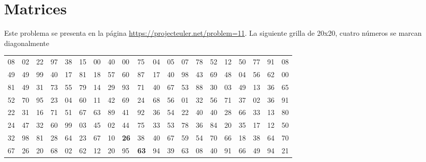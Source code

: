 \section{Matrices}

Este problema se presenta en la página \url{https://projecteuler.net/problem=11}. La siguiente grilla de 20x20, cuatro números se marcan diagonalmente 
\begin{table}[H]
\begin{tabular}{llllllllllllllllllll}
08 & 02 & 22 & 97 & 38 & 15 & 00 & 40                      & 00                               & 75                               & 04                               & 05                               & 07 & 78 & 52 & 12 & 50 & 77 & 91 & 08 \\
49 & 49 & 99 & 40 & 17 & 81 & 18 & 57                      & 60                               & 87                               & 17                               & 40                               & 98 & 43 & 69 & 48 & 04 & 56 & 62 & 00 \\
81 & 49 & 31 & 73 & 55 & 79 & 14 & 29                      & 93                               & 71                               & 40                               & 67                               & 53 & 88 & 30 & 03 & 49 & 13 & 36 & 65 \\
52 & 70 & 95 & 23 & 04 & 60 & 11 & 42                      & 69                               & 24                               & 68                               & 56                               & 01 & 32 & 56 & 71 & 37 & 02 & 36 & 91 \\
22 & 31 & 16 & 71 & 51 & 67 & 63 & 89                      & 41                               & 92                               & 36                               & 54                               & 22 & 40 & 40 & 28 & 66 & 33 & 13 & 80 \\
24 & 47 & 32 & 60 & 99 & 03 & 45 & 02                      & 44                               & 75                               & 33                               & 53                               & 78 & 36 & 84 & 20 & 35 & 17 & 12 & 50 \\ \cline{9-9}
32 & 98 & 81 & 28 & 64 & 23 & 67 & \multicolumn{1}{l|}{10} & \multicolumn{1}{l|}{\textbf{26}} & 38                               & 40                               & 67                               & 59 & 54 & 70 & 66 & 18 & 38 & 64 & 70 \\ \cline{9-10}
67 & 26 & 20 & 68 & 02 & 62 & 12 & 20                      & \multicolumn{1}{l|}{95}          & \multicolumn{1}{l|}{\textbf{63}} & 94                               & 39                               & 63 & 08 & 40 & 91 & 66 & 49 & 94 & 21 \\ \cline{10-11}

\end{tabular}
\end{table}
